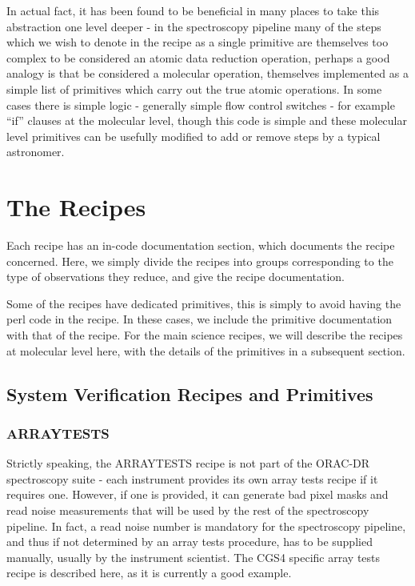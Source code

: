 \documentclass[twoside,11pt]{article}
\renewcommand{\_}{\texttt{\symbol{95}}}
\begin{document}
In actual fact, it has been found to be beneficial in many places to
take this abstraction one level deeper - in the spectroscopy pipeline
many of the steps which we wish to denote in the recipe as a single
primitive are themselves too complex to be considered an atomic data
reduction operation, perhaps a good analogy is that be considered a
molecular operation, themselves implemented as a simple list of
primitives which carry out the true atomic operations. In some cases
there is simple logic - generally simple flow control switches - for
example ``if'' clauses at the molecular level, though this code is
simple and these molecular level primitives can be usefully modified
to add or remove steps by a typical astronomer.

\section{The Recipes}

Each recipe has an in-code documentation section, which documents the
recipe concerned. Here, we simply divide the recipes into groups
corresponding to the type of observations they reduce, and give the
recipe documentation.

Some of the recipes have dedicated primitives, this is simply to
avoid having the perl code in the recipe. In these cases, we include
the primitive documentation with that of the recipe. For the main
science recipes, we will describe the recipes at molecular level
here, with the details of the primitives in a subsequent section.

\subsection{System Verification Recipes and Primitives}

\subsubsection{ARRAY\_TESTS}

Strictly speaking, the ARRAY\_TESTS recipe is not part of the ORAC-DR
spectroscopy suite - each instrument provides its own array tests
recipe if it requires one. However, if one is provided, it can
generate bad pixel masks and read noise measurements that will be used
by the rest of the spectroscopy pipeline. In fact, a read noise number
is mandatory for the spectroscopy pipeline, and thus if not determined
by an array tests procedure, has to be supplied manually, usually by
the instrument scientist. The CGS4 specific array tests recipe is
described here, as it is currently a good example.
\end{document}
